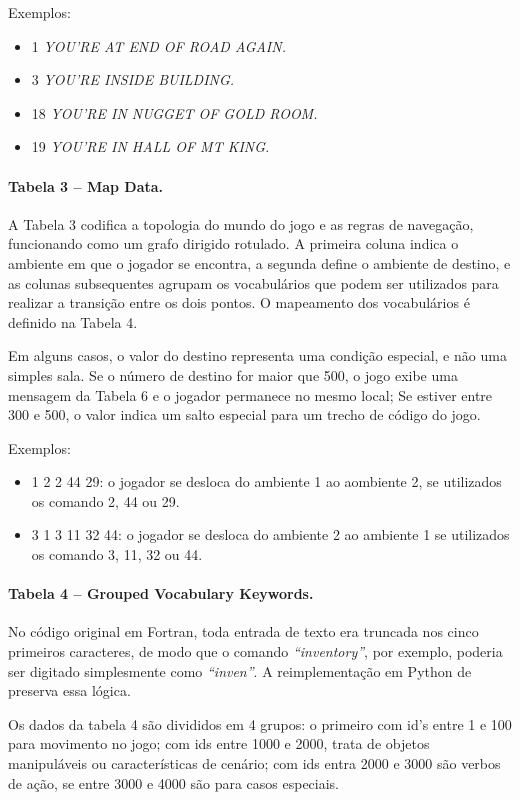 \documentclass[12pt,a4paper]{article}
\begin{document}
Exemplos:  
\begin{itemize}
    \item 1 \textit{YOU'RE AT END OF ROAD AGAIN.}
    \item 3 \textit{YOU'RE INSIDE BUILDING.}
    \item 18 \textit{YOU'RE IN NUGGET OF GOLD ROOM.}
    \item 19 \textit{YOU'RE IN HALL OF MT KING.}
\end{itemize}

\paragraph{Tabela 3 – Map Data.}
A Tabela 3 codifica a topologia do mundo do jogo e as regras de navegação, funcionando como um grafo dirigido rotulado. A primeira coluna indica o ambiente em que o jogador se encontra, a segunda define o ambiente de destino, e as colunas subsequentes agrupam os vocabulários que podem ser utilizados para realizar a transição entre os dois pontos. O mapeamento dos vocabulários é definido na Tabela 4.  

Em alguns casos, o valor do destino representa uma condição especial, e não uma simples sala. Se o número de destino for maior que 500, o jogo exibe uma mensagem da Tabela 6 e o jogador permanece no mesmo local; Se estiver entre 300 e 500, o valor indica um salto especial para um trecho de código do jogo.
   
Exemplos:
\begin{itemize}
  \item 1  2  2  44  29: o jogador se desloca do ambiente 1 ao aombiente 2, se utilizados os comando 2, 44 ou 29. 
  \item 3  1  3  11  32  44: o jogador se desloca do ambiente 2 ao ambiente 1 se utilizados os comando 3, 11, 32 ou 44.
\end{itemize}

\paragraph{Tabela 4 – Grouped Vocabulary Keywords.}
No código original em Fortran, toda entrada de texto era truncada nos cinco primeiros caracteres, de modo que o comando \textit{“inventory”}, por exemplo, poderia ser digitado simplesmente como \textit{“inven”}. A reimplementação em Python de \textcite{rhodes_adventure_py} preserva essa lógica.  

Os dados da tabela 4 são divididos em 4 grupos: o primeiro com id's entre 1 e 100 para movimento no jogo; com ids entre 1000 e 2000, trata de objetos manipuláveis ou características de cenário; com ids entra 2000 e 3000 são verbos de ação, se entre 3000 e 4000 são para casos especiais.
\end{document}
